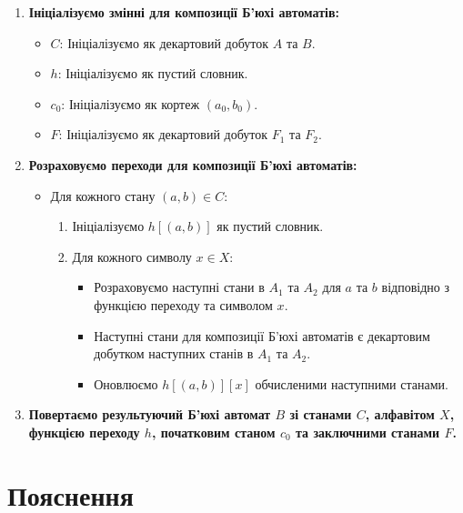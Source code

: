 \documentclass[12pt,a4paper]{article}
\begin{document}
\begin{enumerate}
    \item \textbf{Ініціалізуємо змінні для композиції Б'юхі автоматів:}
    \begin{itemize}
        \item \( C \): Ініціалізуємо як декартовий добуток \( A \) та \( B \).
        \item \( h \): Ініціалізуємо як пустий словник.
        \item \( c_0 \): Ініціалізуємо як кортеж \( (a_0, b_0) \).
        \item \( F \): Ініціалізуємо як декартовий добуток \( F_1 \) та \( F_2 \).
    \end{itemize}

    \item \textbf{Розраховуємо переходи для композиції Б'юхі автоматів:}
    \begin{itemize}
        \item Для кожного стану \( (a, b) \in C \):
        \begin{enumerate}
            \item Ініціалізуємо \( h[(a, b)] \) як пустий словник.
            \item Для кожного символу \( x \in X \):
            \begin{itemize}
                \item Розраховуємо наступні стани в \( A_1 \) та \( A_2 \) для \( a \) та \( b \) відповідно з функцією переходу та символом \( x \).
                \item Наступні стани для композиції Б'юхі автоматів є декартовим добутком наступних станів в \( A_1 \) та \( A_2 \).
                \item Оновлюємо \( h[(a, b)][x] \) обчисленими наступними станами.
            \end{itemize}
        \end{enumerate}
    \end{itemize}

    \item \textbf{Повертаємо результуючий Б'юхі автомат \( B \) зі станами \( C \), алфавітом \( X \), функцією переходу \( h \), початковим станом \( c_0 \) та заключними станами \( F \).}
\end{enumerate}

\section*{Пояснення}
\end{document}
